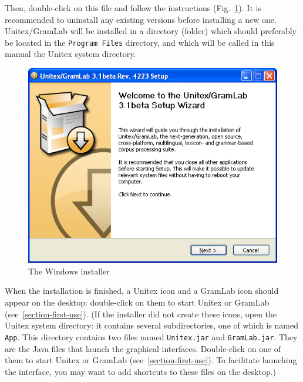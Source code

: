 \begin{flushleft}
{\tt \UnitexPackageWin{}}
{\tt \UnitexPackageWinSF{}}
\end{flushleft}

\noindent Then, double-click on this file and follow the instructions (Fig.~\ref{fig-installer}).
It is recommended to uninstall any
existing versions before installing a new one. Unitex/GramLab will be installed in a directory
(folder) which should preferably be located in the \verb+Program Files+
directory, and which will be called in this manual the Unitex system directory.

\begin{figure}[!ht]
\begin{center}
\includegraphics[width=13cm]{resources/img/installer.png}
\caption{The Windows installer\label{fig-installer}}
\end{center}
\end{figure}


\bigskip
\noindent When the installation is finished, a Unitex icon and a GramLab icon should appear on the desktop:
double-click on them to start Unitex or GramLab (see~\ref{section-first-use}).
(If the installer did not create these icons, open the Unitex system directory:
it contains several subdirectories, one  of which is named \verb+App+. This directory contains two files named
\verb+Unitex.jar+ and \verb+GramLab.jar+. They are the Java files that
launch the graphical interfaces. Double-click on one of them to start Unitex or GramLab
(see~\ref{section-first-use}). To facilitate launching the interface, you may want to add shortcuts
to these files on the desktop.)

